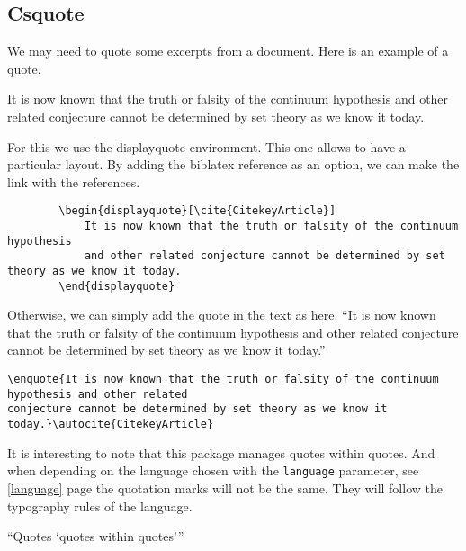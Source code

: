 \subsection{Csquote}
We may need to quote some excerpts from a document. Here is an example of a quote.
\begin{displayquote}
    It is now known that the truth or falsity of the continuum hypothesis
    and other related conjecture cannot be determined by set theory as we know it today.
\end{displayquote}

For this we use the displayquote environment. This one allows to have a particular layout.
By adding the biblatex reference as an option, we can make the link with the references.
\begin{code}
    \begin{verbatim}
        \begin{displayquote}[\cite{CitekeyArticle}]
            It is now known that the truth or falsity of the continuum hypothesis
            and other related conjecture cannot be determined by set theory as we know it today.
        \end{displayquote}
\end{verbatim}
    \caption{Use of displayquote}
\end{code}

Otherwise, we can simply add the quote in the text as here. \enquote{It is now known that the truth
    or falsity of the continuum hypothesis and other related conjecture cannot be determined by set
    theory as we know it today.} \autocite{CitekeyArticle}
\begin{code}
    \begin{verbatim}
\enquote{It is now known that the truth or falsity of the continuum hypothesis and other related
conjecture cannot be determined by set theory as we know it today.}\autocite{CitekeyArticle}
\end{verbatim}
    \caption{Use of enquote}
\end{code}

It is interesting to note that this package manages quotes within quotes. And when depending on the
language chosen with the \texttt{language} parameter, see \ref{language} page
\pageref{language} the quotation marks will not be the same. They will follow the typography rules
of the language.

\enquote{Quotes \enquote{quotes within quotes}}

